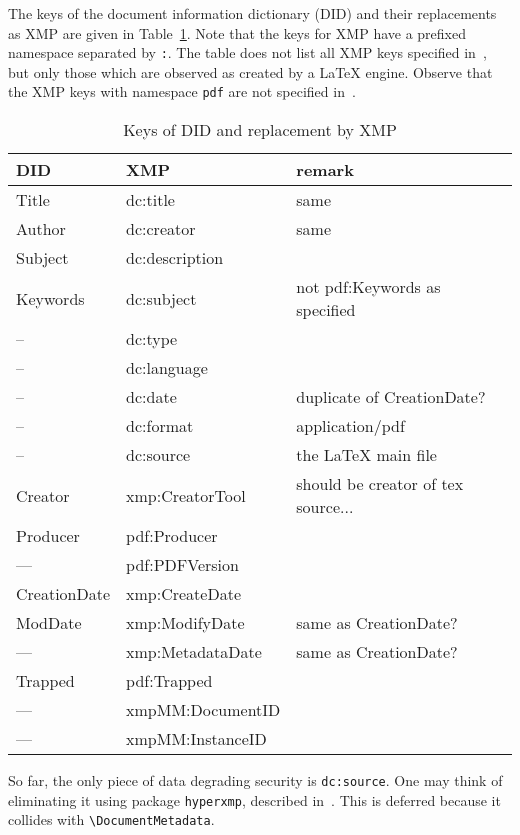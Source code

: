 \documentclass[a4paper, english]{article}%
\newcommand{\cmd}[1]{\texttt{\textbackslash#1}}
\begin{document}
The keys of the document information dictionary (DID) 
and their replacements as XMP are given in Table~\ref{tab:keysDID_XMP}. 
Note that the keys for XMP have a prefixed namespace separated by \texttt{:}. 
The table does not list all XMP keys specified in~\cite{ISO16684-1}, 
but only those which are observed as created by a \LaTeX{} engine. 
Observe that the XMP keys with namespace \texttt{pdf} are not specified in~\cite{ISO16684-1}. 


\begin{longtable}{|lll|}
  \toprule
  DID & XMP & remark \\
  \midrule
  \midrule
  \endfirsthead%
  \bottomrule
  \caption{\label{tab:keysDID_XMP} Keys of DID and replacement by XMP}
  \endlastfoot%
  Title        & dc:title   & same\\
  Author       & dc:creator & same \\
  Subject      & dc:description & \\
  Keywords     & dc:subject & not pdf:Keywords as specified \\
  --           & dc:type & \\
  --           & dc:language & \\
  --           & dc:date & duplicate of CreationDate? \\
  --           & dc:format & application/pdf \\
  --           & dc:source & the \LaTeX{} main file \\%
  Creator      & xmp:CreatorTool & should be creator of tex source... \\
  Producer     & pdf:Producer & \\
  ---          & pdf:PDFVersion & \\
  CreationDate & xmp:CreateDate & \\
  ModDate      & xmp:ModifyDate & same as CreationDate? \\
  ---          & xmp:MetadataDate & same as CreationDate? \\
  Trapped      & pdf:Trapped & \\
  ---          & xmpMM:DocumentID & \\
  ---          & xmpMM:InstanceID & \\
\end{longtable}

So far, the only piece of data degrading security 
is \texttt{dc:source}. 
One may think of eliminating it using package \texttt{hyperxmp}, 
described in~\cite{HyperXmpP}. 
This is deferred because it collides with \cmd{DocumentMetadata}. 
\end{document}
